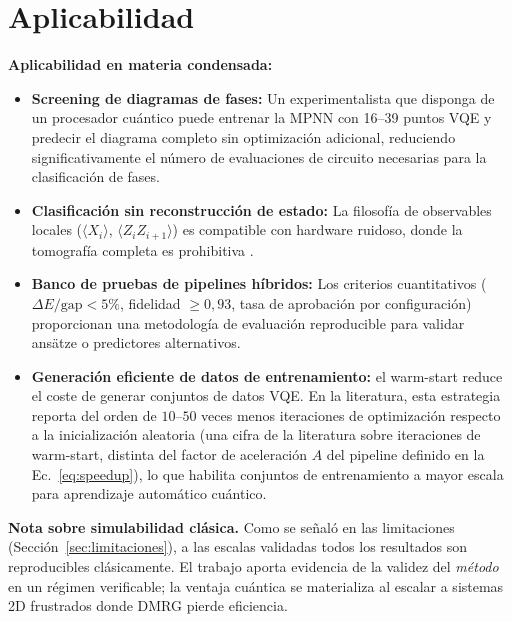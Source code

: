 \documentclass[11pt,a4paper,spanish]{book}
\begin{document}
\section{Aplicabilidad}
\label{sec:aplicabilidad}

\textbf{Aplicabilidad en materia condensada:}

\begin{itemize}
    \item \textbf{Screening de diagramas de fases:} Un experimentalista que disponga de un procesador cuántico puede entrenar la MPNN con 16--39 puntos VQE y predecir el diagrama completo sin optimización adicional, reduciendo significativamente el número de evaluaciones de circuito necesarias para la clasificación de fases.

    \item \textbf{Clasificación sin reconstrucción de estado:} La filosofía de observables locales ($\langle X_i \rangle$, $\langle Z_i Z_{i+1} \rangle$) es compatible con hardware ruidoso, donde la tomografía completa es prohibitiva \citep{sharma2026}.

    \item \textbf{Banco de pruebas de pipelines híbridos:} Los criterios cuantitativos ($\Delta E/\text{gap} < 5\%$, fidelidad $\geq 0,93$, tasa de aprobación por configuración) proporcionan una metodología de evaluación reproducible para validar ansätze o predictores alternativos.

    \item \textbf{Generación eficiente de datos de entrenamiento:} el warm-start reduce el coste de generar conjuntos de datos VQE. En la literatura, esta estrategia reporta del orden de $10$--$50$ veces menos iteraciones de optimización respecto a la inicialización aleatoria \citep{puig2025} (una cifra de la literatura sobre iteraciones de warm-start, distinta del factor de aceleración $A$ del pipeline definido en la Ec.~\ref{eq:speedup}), lo que habilita conjuntos de entrenamiento a mayor escala para aprendizaje automático cuántico.
\end{itemize}

\textbf{Nota sobre simulabilidad clásica.} Como se señaló en las limitaciones (Sección~\ref{sec:limitaciones}), a las escalas validadas todos los resultados son reproducibles clásicamente. El trabajo aporta evidencia de la validez del \emph{método} en un régimen verificable; la ventaja cuántica se materializa al escalar a sistemas 2D frustrados donde DMRG pierde eficiencia.


\end{document}
